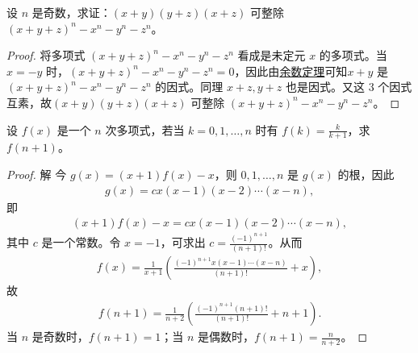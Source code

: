 \documentclass[../../main.tex]{subfiles}
\begin{document}
\begin{example}
设 $n$ 是奇数，求证：$(x + y)(y + z)(x + z)$ 可整除 $(x + y + z)^n - x^n - y^n - z^n$。
\end{example}
\begin{proof}
将多项式 $(x + y + z)^n - x^n - y^n - z^n$ 看成是未定元 $x$ 的多项式。当 $x = -y$ 时，$(x + y + z)^n - x^n - y^n - z^n = 0$，因此由\hyperref[theorem:余数定理]{余数定理}可知$x + y$ 是 $(x + y + z)^n - x^n - y^n - z^n$ 的因式。同理 $x + z, y + z$ 也是因式。又这 3 个因式互素，故$(x + y)(y + z)(x + z)$ 可整除 $(x + y + z)^n - x^n - y^n - z^n$。
\end{proof}

\begin{example}
设 $f(x)$ 是一个 $n$ 次多项式，若当 $k = 0, 1, \ldots, n$ 时有 $f(k) = \frac{k}{k + 1}$，求 $f(n + 1)$。
\end{example}
\begin{proof}
解 今 $g(x) = (x + 1)f(x) - x$，则 $0, 1, \ldots, n$ 是 $g(x)$ 的根，因此
\begin{align*}
g(x) = c x(x - 1)(x - 2) \cdots (x - n),
\end{align*}
即
\begin{align*}
(x + 1)f(x) - x = c x(x - 1)(x - 2) \cdots (x - n),
\end{align*}
其中 $c$ 是一个常数。令 $x = -1$，可求出 $c = \frac{(-1)^{n+1}}{(n + 1)!}$。从而
\begin{align*}
f(x) = \frac{1}{x + 1} \left( \frac{(-1)^{n+1} x(x - 1) \cdots (x - n)}{(n + 1)!} + x \right),
\end{align*}
故
\begin{align*}
f(n + 1) = \frac{1}{n + 2} \left( \frac{(-1)^{n+1} (n + 1)!}{(n + 1)!} + n + 1 \right).
\end{align*}
当 $n$ 是奇数时，$f(n + 1) = 1$；当 $n$ 是偶数时，$f(n + 1) = \frac{n}{n + 2}$。
\end{proof}
\end{document}
